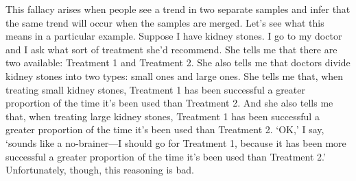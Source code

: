This fallacy arises when people see a trend in two separate samples and infer that the same trend will occur when the samples are merged. Let's see what this means in a particular example. Suppose I have kidney stones. I go to my doctor and I ask what sort of treatment she'd recommend. She tells me that there are two available: Treatment 1 and Treatment 2. She also tells me that doctors divide kidney stones into two types: small ones and large ones. She tells me that, when treating small kidney stones, Treatment 1 has been successful a greater proportion of the time it's been used than Treatment 2. And she also tells me that, when treating large kidney stones, Treatment 1 has been successful a greater proportion of the time it's been used than Treatment 2. `OK,' I say, `sounds like a no-brainer---I should go for Treatment 1, because it has been more successful a greater proportion of the time it's been used than Treatment 2.' Unfortunately, though, this reasoning is bad.

